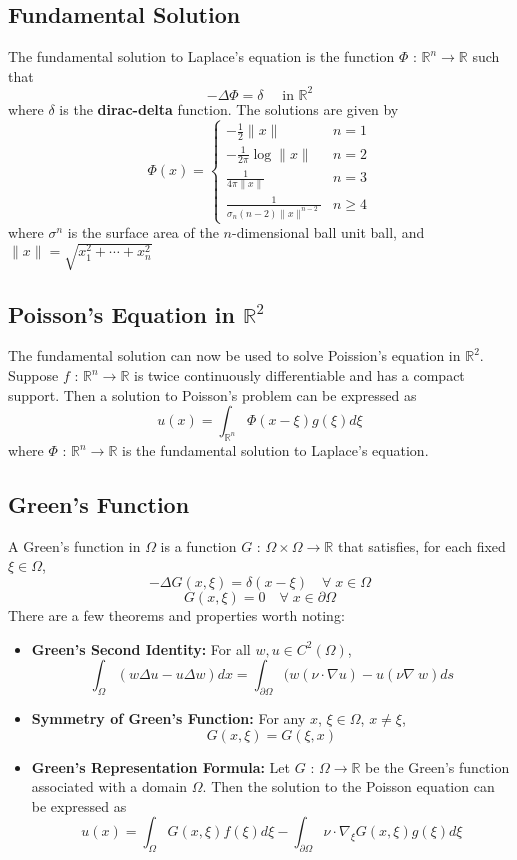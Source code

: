 \documentclass[11pt]{article}
\newcommand{\R}{\mathbb{R}}
\begin{document}
\subsection{Fundamental Solution}
The fundamental solution to Laplace’s equation is the function $\Phi$ : $\R^n \rightarrow \R$ such that
$$ - \Delta \Phi = \delta \quad \text{ in } \R^2$$
where $\delta$ is the \textbf{dirac-delta} function. The solutions are given by 
\[ \Phi(x) =  
 \begin{cases} 
      -\frac{1}{2} \|x \| & n=1 \\
      -\frac{1}{2 \pi} \log \|x \| & n=2 \\
      \frac{1}{4 \pi \|x \| } & n=3  \\
      \frac{1}{\sigma_n (n-2) \|x \|^{n-2} } & n\geq 4 
   \end{cases}
\]
where $\sigma^n$ is the surface area of the $n$-dimensional ball unit ball, and $\|x \| = \sqrt{x_1^2 + \cdots + x_n^2}$

\subsection{Poisson's Equation in  $\R^2$}
The fundamental solution can now be used to solve Poission's equation in $\R^2$. Suppose $f$ : $\R^n \rightarrow \R$ is twice continuously differentiable and has a compact support. Then a solution to Poisson’s problem can be expressed as
$$ u(x) = \int _{\R^n} \Phi(x-\xi) g(\xi) d\xi $$ 
where $\Phi$ : $\R^n \rightarrow \R$ is the fundamental solution to Laplace's equation.

\subsection{Green's Function}
A Green’s function in $\Omega$ is a function $G$ : $\Omega \times \Omega \rightarrow \R$ that satisfies, for each fixed $\xi \in \Omega$,
$$ -\Delta G(x, \xi) =\delta(x-\xi) \quad \forall \; x \in \Omega $$
$$ G(x, \xi) = 0 \quad \forall \; x \in \partial \Omega $$
There are a few theorems and properties worth noting:
\begin{itemize}
\item \textbf{Green's Second Identity:} For all $w, u \in C^2(\Omega)$,
$$ \int_{\Omega} (w\Delta u - u \Delta w ) dx = \int_{\partial \Omega} (w (\nu \cdot \nabla u) - u (\nu \nabla \ w ) ds $$
\item \textbf{Symmetry of Green's Function:} For any $x$, $\xi \in \Omega$, $ x \neq \xi$,  $$ G(x, \xi) = G(\xi, x) $$
\item \textbf{Green's Representation Formula:} Let $G$ : $\Omega \rightarrow \R$ be the Green’s function associated with a domain $\Omega$. Then the solution to the Poisson equation can be expressed as
$$ u(x) = \int_{\Omega} G(x, \xi) f(\xi) d\xi - \int_{\partial \Omega} \nu \cdot \nabla_{\xi} G(x, \xi) g(\xi) d\xi  $$
\end{itemize}
\end{document}
